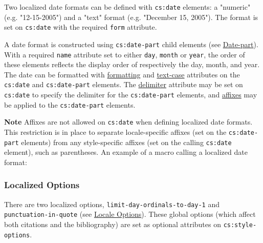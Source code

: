 Two localized date formats can be defined with \texttt{cs:date}
elements: a "numeric" (e.g. "12-15-2005") and a "text" format (e.g.
"December 15, 2005"). The format is set on \texttt{cs:date} with the
required \texttt{form} attribute.

A date format is constructed using \texttt{cs:date-part} child elements
(see \protect\hyperlink{date-part}{Date-part}). With a required
\texttt{name} attribute set to either \texttt{day}, \texttt{month} or
\texttt{year}, the order of these elements reflects the display order of
respectively the day, month, and year. The date can be formatted with
\protect\hyperlink{formatting}{formatting} and
\protect\hyperlink{text-case}{text-case} attributes on the
\texttt{cs:date} and \texttt{cs:date-part} elements. The
\protect\hyperlink{delimiter}{delimiter} attribute may be set on
\texttt{cs:date} to specify the delimiter for the \texttt{cs:date-part}
elements, and \protect\hyperlink{affixes}{affixes} may be applied to the
\texttt{cs:date-part} elements.

\textbf{Note} Affixes are not allowed on \texttt{cs:date} when defining
localized date formats. This restriction is in place to separate
locale-specific affixes (set on the \texttt{cs:date-part} elements) from
any style-specific affixes (set on the calling \texttt{cs:date}
element), such as parentheses. An example of a macro calling a localized
date format:

\begin{Shaded}
\begin{Highlighting}[]
\NormalTok{\textless{}}\NormalTok{\textgreater{}}
\NormalTok{ \textless{}}\NormalTok{/\textgreater{}}
\NormalTok{\textless{}/}\NormalTok{\textgreater{}}
\end{Highlighting}
\end{Shaded}

\hypertarget{localized-options}{%
\subsubsection{Localized Options}\label{localized-options}}

There are two localized options, \texttt{limit-day-ordinals-to-day-1}
and \texttt{punctuation-in-quote} (see
\protect\hyperlink{locale-options}{Locale Options}). These global
options (which affect both citations and the bibliography) are set as
optional attributes on \texttt{cs:style-options}.

